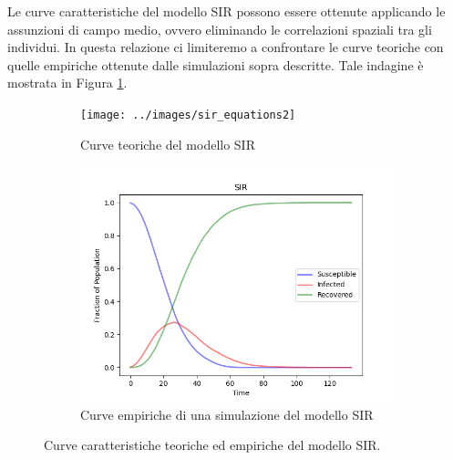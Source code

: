 \documentclass{article}
\begin{document}
    Le curve caratteristiche del modello SIR possono essere ottenute applicando le assunzioni di campo medio, ovvero
    eliminando le correlazioni spaziali tra gli individui. In questa relazione ci limiteremo a confrontare le curve teoriche
    con quelle empiriche ottenute dalle simulazioni sopra descritte. Tale indagine è mostrata in Figura \ref{fig:sir_curves}.
    \begin{figure}[H]
        \centering
        \begin{subfigure}[b]{0.49\linewidth}
         \centering
         \texttt{[image: ../images/sir\_equations2]}
            \caption{Curve teoriche del modello SIR}
        \end{subfigure}
        \hfill
        \begin{subfigure}[b]{0.49\linewidth}
         \centering
         \includegraphics[width=\linewidth]{../images/sir_curves1}
            \caption{Curve empiriche di una simulazione del modello SIR}
        \end{subfigure}
        \caption{Curve caratteristiche teoriche ed empiriche del modello SIR.}
        \label{fig:sir_curves}
    \end{figure}
\end{document}
